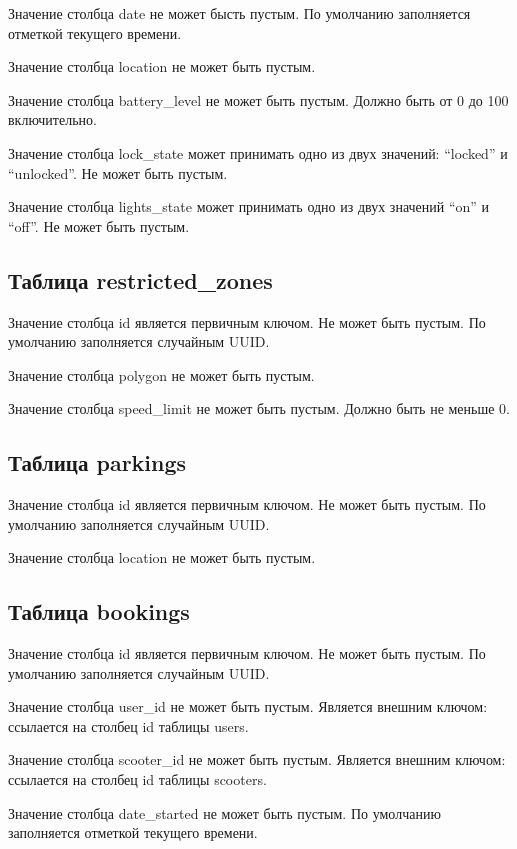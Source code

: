Значение столбца date не может бысть пустым. По умолчанию заполняется отметкой текущего времени.

Значение столбца location не может быть пустым.

Значение столбца battery\_level не может быть пустым. Должно быть от 0 до 100 включительно.

Значение столбца lock\_state может принимать одно из двух значений: \enquote{locked} и \enquote{unlocked}. Не может быть пустым.

Значение столбца lights\_state может принимать одно из двух значений \enquote{on} и \enquote{off}. Не может быть пустым.

\subsection{Таблица restricted\_zones}

Значение столбца id является первичным ключом. Не может быть пустым. По умолчанию заполняется случайным UUID.

Значение столбца polygon не может быть пустым.

Значение столбца speed\_limit не может быть пустым. Должно быть не меньше 0.

\subsection{Таблица parkings}

Значение столбца id является первичным ключом. Не может быть пустым. По умолчанию заполняется случайным UUID.

Значение столбца location не может быть пустым.

\subsection{Таблица bookings}

Значение столбца id является первичным ключом. Не может быть пустым. По умолчанию заполняется случайным UUID.

Значение столбца user\_id не может быть пустым. Является внешним ключом: ссылается на столбец id таблицы users.

Значение столбца scooter\_id не может быть пустым. Является внешним ключом: ссылается на столбец id таблицы scooters.

Значение столбца date\_started не может быть пустым. По умолчанию заполняется отметкой текущего времени.

